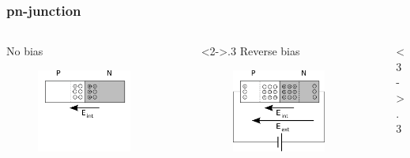 \documentclass[beamer]{standalone}
\begin{document}
\begin{frame}
\frametitle{pn-junction}
 \begin{columns}[t]
  \begin{column}{.3\textwidth}
    No bias
    \begin{figure}
      \includegraphics[width=0.80\textwidth]{./pics/pnjunction_nobias}
    \end{figure}
  \end{column}
  \begin{column}<2->{.3\textwidth}
    Reverse bias
    \begin{figure}
      \includegraphics[width=0.80\textwidth]{./pics/pnjunction_reverse_bias}
    \end{figure}
  \end{column}
  \begin{column}<3->{.3\textwidth}

\end{column}
\end{columns}
\end{frame}
\end{document}
